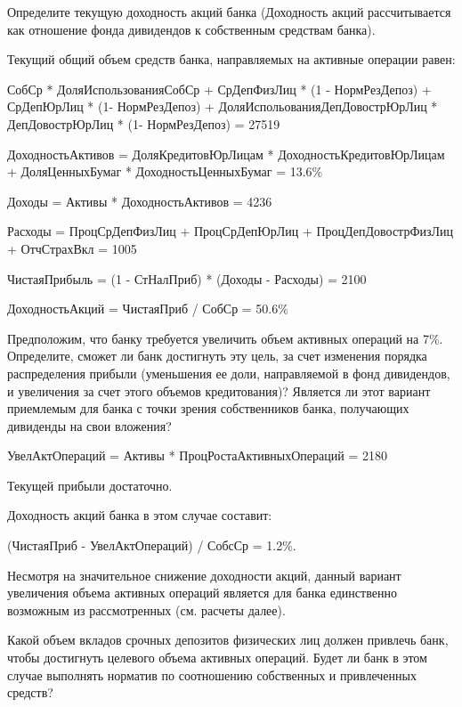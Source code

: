 \documentclass[12pt, table, a4paper,twoside]{exam}
\begin{document}
\begin{questions}
\vfill\null\pagebreak
\begin{subparts}
	\subpart[5] Определите текущую доходность акций банка (Доходность акций рассчитывается как отношение фонда дивидендов к собственным средствам банка). 

\begin{solution}[12em]
	
	Текущий общий объем средств банка, направляемых на активные операции равен:
	
	СобСр * ДоляИспользованияСобСр + СрДепФизЛиц * (1 - НормРезДепоз) + СрДепЮрЛиц * (1- НормРезДепоз)  + ДоляИспольованияДепДовострЮрЛиц * ДепДовострЮрЛиц * (1- НормРезДепоз) = 27519
			
	ДоходностьАктивов = ДоляКредитовЮрЛицам * ДоходностьКредитовЮрЛицам + ДоляЦенныхБумаг * ДоходностьЦенныхБумаг = 13.6\%
	
	Доходы = Активы * ДоходностьАктивов = 4236
	
	Расходы = ПроцСрДепФизЛиц + ПроцСрДепЮрЛиц + ПроцДепДовострФизЛиц + ОтчСтрахВкл = 1005
			
	ЧистаяПрибыль = (1 - СтНалПриб) * (Доходы - Расходы) = 2100
			
	ДоходностьАкций = ЧистаяПриб / СобСр = 50.6\%
	
\end{solution}
	
	\subpart[5] Предположим, что банку требуется увеличить объем активных операций на 7\%. Определите, сможет ли банк достигнуть эту цель, за счет изменения порядка распределения прибыли (уменьшения ее доли, направляемой в фонд дивидендов, и увеличения за счет этого объемов кредитования)? Является ли этот вариант приемлемым для банка с точки зрения собственников банка, получающих дивиденды на свои вложения?
	
	\begin{solution}[12em]
		
		УвелАктОпераций = Активы * ПроцРостаАктивныхОпераций = 2180
		
		Текущей прибыли достаточно. 
		
		Доходность акций банка в этом случае составит:
		
		(ЧистаяПриб - УвелАктОпераций) / СобсСр = 1.2\%.
		
		Несмотря на значительное снижение доходности акций, данный вариант увеличения объема активных операций является для банка единственно возможным из рассмотренных (см. расчеты далее).		
	\end{solution}
	
	\subpart[10] Какой объем вкладов срочных депозитов физических лиц должен привлечь банк, чтобы достигнуть целевого объема активных операций. Будет ли банк в этом случае выполнять норматив по соотношению собственных и привлеченных средств?
		

\end{subparts}
\end{questions}
\end{document}
